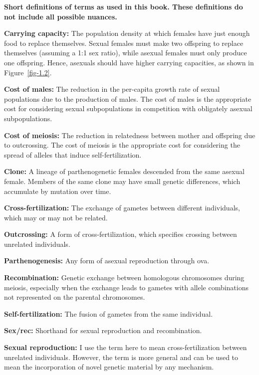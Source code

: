 \documentclass[
  letterpaper,
]{book}
\begin{document}
\begin{tcolorbox}[enhanced jigsaw, toprule=.15mm, rightrule=.15mm, arc=.35mm, titlerule=0mm, breakable, opacityback=0, leftrule=.75mm, bottomtitle=1mm, toptitle=1mm, title=\textcolor{quarto-callout-tip-color}{\faLightbulb}\hspace{0.5em}{Box 1.1}, left=2mm, coltitle=black, colframe=quarto-callout-tip-color-frame, colbacktitle=quarto-callout-tip-color!10!white, bottomrule=.15mm, opacitybacktitle=0.6, colback=white]

\textbf{Short definitions of terms as used in this book. These
definitions do not include all possible nuances.}

\textbf{Carrying capacity:} The population density at which females have
just enough food to replace themselves. Sexual females must make two
offspring to replace themselves (assuming a 1:1 sex ratio), while
asexual females must only produce one offspring. Hence, asexuals should
have higher carrying capacities, as shown in Figure~\ref{fig-1.2}.

\textbf{Cost of males:} The reduction in the per-capita growth rate of
sexual populations due to the production of males. The cost of males is
the appropriate cost for considering sexual subpopulations in
competition with obligately asexual subpopulations.

\textbf{Cost of meiosis:} The reduction in relatedness between mother
and offspring due to outcrossing. The cost of meiosis is the appropriate
cost for considering the spread of alleles that induce
self-fertilization.

\textbf{Clone:} A lineage of parthenogenetic females descended from the
same asexual female. Members of the same clone may have small genetic
differences, which accumulate by mutation over time.

\textbf{Cross-fertilization:} The exchange of gametes between different
individuals, which may or may not be related.

\textbf{Outcrossing:} A form of cross-fertilization, which specifies
crossing between unrelated individuals.

\textbf{Parthenogenesis:} Any form of asexual reproduction through ova.

\textbf{Recombination:} Genetic exchange between homologous chromosomes
during meiosis, especially when the exchange leads to gametes with
allele combinations not represented on the parental chromosomes.

\textbf{Self-fertilization:} The fusion of gametes from the same
individual.

\textbf{Sex/rec:} Shorthand for sexual reproduction and recombination.

\textbf{Sexual reproduction:} I use the term here to mean
cross-fertilization between unrelated individuals. However, the term is
more general and can be used to mean the incorporation of novel genetic
material by any mechanism.

\end{tcolorbox}
\end{document}
